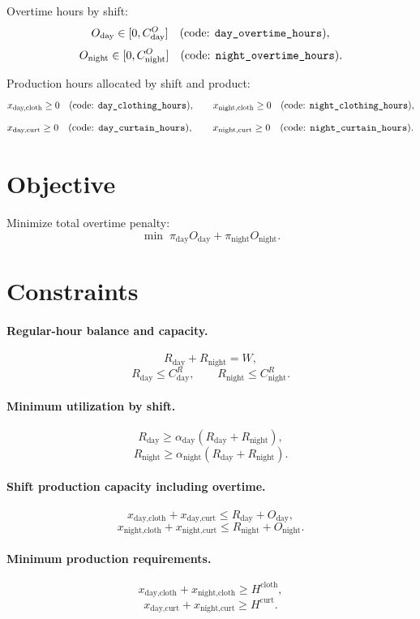 Overtime hours by shift:
\[
O_{\text{day}} \in [0,C^{O}_{\text{day}}] \quad \text{(code: \texttt{day\_overtime\_hours})},
\]
\[
O_{\text{night}} \in [0,C^{O}_{\text{night}}] \quad \text{(code: \texttt{night\_overtime\_hours})}.
\]

Production hours allocated by shift and product:
\[
x_{\text{day,cloth}} \ge 0 \quad \text{(code: \texttt{day\_clothing\_hours})},
\qquad
x_{\text{night,cloth}} \ge 0 \quad \text{(code: \texttt{night\_clothing\_hours})},
\]
\[
x_{\text{day,curt}} \ge 0 \quad \text{(code: \texttt{day\_curtain\_hours})},
\qquad
x_{\text{night,curt}} \ge 0 \quad \text{(code: \texttt{night\_curtain\_hours})}.
\]

\section*{Objective}

Minimize total overtime penalty:
\[
\min \; \pi_{\text{day}} O_{\text{day}} + \pi_{\text{night}} O_{\text{night}}.
\]

\section*{Constraints}

\paragraph{Regular-hour balance and capacity.}
\[
R_{\text{day}} + R_{\text{night}} = W,
\]
\[
R_{\text{day}} \le C^{R}_{\text{day}},
\qquad
R_{\text{night}} \le C^{R}_{\text{night}}.
\]

\paragraph{Minimum utilization by shift.}
\[
R_{\text{day}} \ge \alpha_{\text{day}}(R_{\text{day}} + R_{\text{night}}),
\]
\[
R_{\text{night}} \ge \alpha_{\text{night}}(R_{\text{day}} + R_{\text{night}}).
\]

\paragraph{Shift production capacity including overtime.}
\[
x_{\text{day,cloth}} + x_{\text{day,curt}} \le R_{\text{day}} + O_{\text{day}},
\]
\[
x_{\text{night,cloth}} + x_{\text{night,curt}} \le R_{\text{night}} + O_{\text{night}}.
\]

\paragraph{Minimum production requirements.}
\[
x_{\text{day,cloth}} + x_{\text{night,cloth}} \ge H^{\text{cloth}},
\]
\[
x_{\text{day,curt}} + x_{\text{night,curt}} \ge H^{\text{curt}}.
\]

